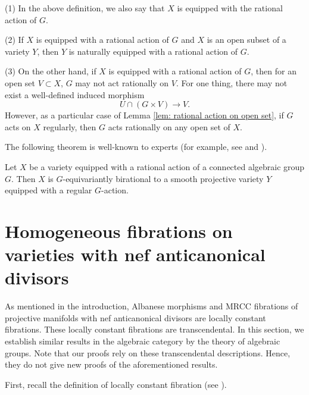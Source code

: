 \documentclass[11pt]{amsart}
\begin{document}
\begin{remark}\label{rmk: rational action}
(1) In the above definition, we also say that $X$ is equipped with the rational action of $G$.

(2) If $X$ is equipped with a rational action of $G$ and $X$ is an open subset of a variety $Y$, then $Y$ is naturally equipped with a rational action of $G$.

(3) On the other hand, if $X$ is equipped with a rational action of $G$, then for an open set $V \subset X$, $G$ may not act rationally on $V$. For one thing, there may not exist a well-defined induced morphism 
\[
U \cap (G \times V) \to V.
\] However, as a particular case of Lemma \ref{lem: rational action on open set}, if $G$ acts on $X$ regularly, then $G$ acts rationally on any open set of $X$.
\end{remark}


The following theorem is well-known to experts (for example, see \cite[\S 1.7, 1.8]{Kra18} and \cite[\S 1]{Bri22}). 

\begin{theorem}\label{thm: Weil's theorem}
Let $X$ be a variety equipped with a rational action of a connected algebraic group $G$. Then $X$ is $G$-equivariantly birational to a smooth projective variety $Y$ equipped with a regular $G$-action. 
\end{theorem}


\section{Homogeneous fibrations on varieties with nef anticanonical divisors}\label{sec: fibrations on varieties with nef anticanonical divisors}

As mentioned in the introduction, Albanese morphisms and MRCC fibrations of projective manifolds with nef anticanonical divisors are locally constant fibrations. These locally constant fibrations are transcendental. In this section, we establish similar results in the algebraic category by the theory of algebraic groups. Note that our proofs rely on these transcendental descriptions. Hence, they do not give new proofs of the aforementioned results. 


First, recall the definition of locally constant fibration (see \cite[Definition 2.3]{MW23}).
\end{document}
